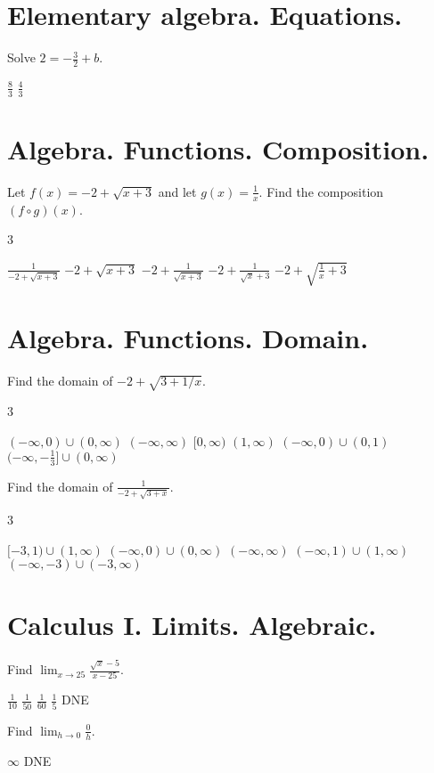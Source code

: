 \documentclass[addpoints]{exam}
\begin{document}
\begin{questions}
\section{Elementary algebra. Equations.}
\question Solve $2=-\frac32+b$. \qquad\qquad
\begin{oneparchoices}
	\correctchoice $\frac83$
	\choice $\frac43$
	\end{oneparchoices}

\section{Algebra. Functions. Composition.}
\question Let $f(x) = -2+\sqrt{x+3}$ and let $g(x) = \frac1x$. Find the composition $(f\circ g)(x)$.
\begin{multicols}3
\begin{choices}
	\choice $\frac1{-2+\sqrt{x+3}}$
	\choice $-2+\sqrt{x+3}$
	\choice $-2+\frac1{\sqrt{x+3}}$
	\choice $-2+\frac1{\sqrt x+3}$
	\correctchoice $-2+\sqrt{\frac1x+3}$
	\end{choices}
	\end{multicols}

\section{Algebra. Functions. Domain.}
\question Find the domain of $-2+\sqrt{3+1/x}$.
\begin{multicols}3
\begin{choices}
	\choice $(-\infty,0)\cup(0,\infty)$ %
	\choice $(-\infty,\infty)$ %
	\choice $[0,\infty)$ %
	\choice $(1,\infty)$ %
	\choice $(-\infty,0)\cup(0,1)$ %
	\correctchoice $(-\infty,-\tfrac13]\cup(0,\infty)$ %
	\end{choices}
	\end{multicols}
\question Find the domain of $\frac1{-2+\sqrt{3+x}}$.
\begin{multicols}3
\begin{choices}
	\correctchoice $[-3,1)\cup(1,\infty)$
	\choice $(-\infty,0)\cup(0,\infty)$
	\choice $(-\infty,\infty)$
	\choice $(-\infty,1)\cup(1,\infty)$
	\choice $(-\infty,-3)\cup(-3,\infty)$
	\end{choices}
	\end{multicols}

\section{Calculus I. Limits. Algebraic.}
\question Find $\lim_{x\to 25} \frac{\sqrt x-5}{x-25}$. \qquad\qquad
\begin{oneparchoices}
	\correctchoice $\frac1{10}$
	\choice $\frac1{50}$ %
	\choice $\frac1{60}$
	\choice $\frac15$
	\choice DNE
	\end{oneparchoices}
\question Find $\lim_{h\to0} \frac0h$. \qquad\qquad
\begin{oneparchoices}
	\choice $\infty$
	\choice DNE
	\end{oneparchoices}



\end{questions}
\end{document}
